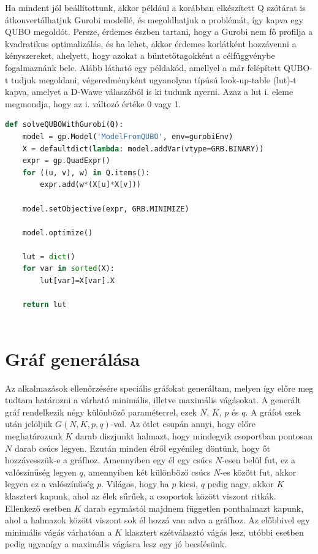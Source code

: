 Ha mindent jól beállítottunk, akkor például a korábban elkészített Q szótárat is átkonvertálhatjuk Gurobi modellé, és megoldhatjuk a problémát, így kapva egy QUBO megoldót. Persze, érdemes észben tartani, hogy a Gurobi nem fő profilja a kvadratikus optimalizálás, és ha lehet, akkor érdemes korlátként hozzávenni a kényszereket, ahelyett, hogy azokat a büntetőtagokként a célfüggvénybe fogalmaznánk bele. Alább látható egy példakód, amellyel a már felépített QUBO-t tudjuk megoldani, végeredményként ugyanolyan típúsú look-up-table (lut)-t kapva, amelyet a D-Wawe válaszából is ki tudunk nyerni. Azaz a lut i. eleme megmondja, hogy az i. változó értéke 0 vagy 1.


\begin{lstlisting}[language=python,caption=Max-cut QUBO,label=code:solveQUBOWithGurobi]	
def solveQUBOWithGurobi(Q):
	model = gp.Model('ModelFromQUBO', env=gurobiEnv)
	X = defaultdict(lambda: model.addVar(vtype=GRB.BINARY))
	expr = gp.QuadExpr()
	for ((u, v), w) in Q.items():
		expr.add(w*(X[u]*X[v]))
	
	model.setObjective(expr, GRB.MINIMIZE)
	
	model.optimize()
	
	lut = dict()
	for var in sorted(X):
		lut[var]=X[var].X
	
	return lut
	
\end{lstlisting}


\section{Gráf generálása}
Az alkalmazások ellenőrzésére speciális gráfokat generáltam, melyen így előre meg tudtam határozni a várható minimális, illetve maximális vágásokat.
A generált gráf rendelkezik négy különböző paraméterrel, ezek $N$, $K$, $p$ és $q$.
A gráfot ezek után jelöljük $G(N,K,p,q)$-val.
Az ötlet csupán annyi, hogy előre meghatározunk $K$ darab diszjunkt halmazt, hogy mindegyik csoportban pontosan $N$ darab csúcs legyen. Ezután minden élről egyénileg döntünk, hogy őt hozzávesszük-e a gráfhoz. Amennyiben egy él egy csúcs $N$-esen belül fut, ez a valószínűség legyen $q$, amennyiben két különböző csúcs $N$-es között fut, akkor legyen ez a valószínűség $p$. Világos, hogy ha $p$ kicsi, $q$ pedig nagy, akkor $K$ klasztert kapunk, ahol az élek sűrűek, a csoportok között viszont ritkák. Ellenkező esetben $K$ darab egymástól majdnem független ponthalmazt kapunk, ahol a halmazok között viszont sok él hozzá van adva a gráfhoz. Az előbbivel egy minimális vágás várhatóan a $K$ klasztert szétválasztó vágás lesz, utóbbi esetben pedig ugyanígy a maximális vágásra lesz egy jó becslésünk.

